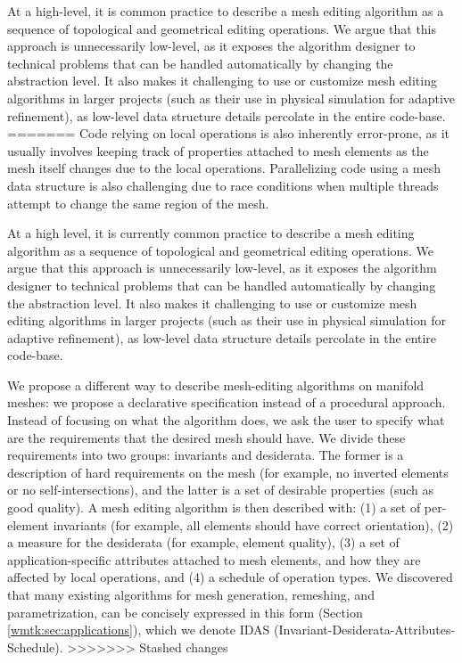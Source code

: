 At a high-level, it is common practice to describe a mesh editing algorithm as a sequence of topological and geometrical editing operations. We argue that this approach is unnecessarily low-level, as it exposes the algorithm designer to technical problems that can be handled automatically by changing the abstraction level. It also makes it challenging to use or customize mesh editing algorithms in larger projects (such as their use in physical simulation for adaptive refinement), as low-level data structure details percolate in the entire code-base. 
=======
Code relying on local operations is also inherently error-prone, as it usually involves keeping track of properties attached to mesh elements as the mesh itself changes due to the local operations. 
Parallelizing code using a mesh data structure is also challenging due to race conditions when multiple threads attempt to change the same region of the mesh. 

At a high level, it is currently common practice to describe a mesh editing algorithm as a sequence of topological and geometrical editing operations. We argue that this approach is unnecessarily low-level, as it exposes the algorithm designer to technical problems that can be handled automatically by changing the abstraction level. It also makes it challenging to use or customize mesh editing algorithms in larger projects (such as their use in physical simulation for adaptive refinement), as low-level data structure details percolate in the entire code-base.

We propose a different way to describe mesh-editing algorithms on manifold meshes: we propose a declarative specification instead of a procedural approach. Instead of focusing on what the algorithm does, we ask the user to specify what are the requirements that the desired mesh should have. We divide these requirements into two groups: invariants and desiderata. The former is a description of hard requirements on the mesh (for example, no inverted elements or no self-intersections), and the latter is a set of desirable properties (such as good quality). A mesh editing algorithm is then described with: (1) a set of per-element invariants (for example, all elements should have correct orientation), (2) a measure for the desiderata (for example, element quality), (3) a set of application-specific attributes attached to mesh elements, and how they are affected by local operations, and (4) a schedule of operation types. We discovered that many existing algorithms for mesh generation, remeshing, and parametrization, can be concisely expressed in this form (Section \ref{wmtk:sec:applications}), which we denote IDAS (Invariant-Desiderata-Attributes-Schedule).
>>>>>>> Stashed changes

